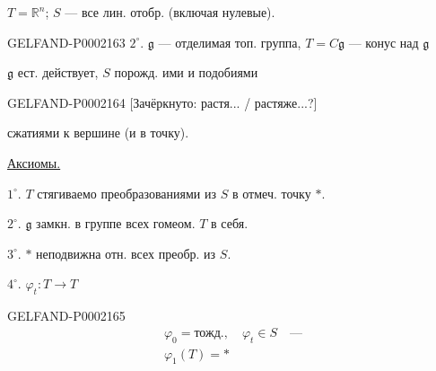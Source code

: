 $T=\mathbb R^n$; $S$ --- все лин. отобр. (включая нулевые).



\begin{GelfandAdjacentEvidence}{GELFAND-P000216}{3}
$2^{\circ}$. $\mathfrak g$ --- отделимая топ. группа, $T=C\mathfrak g$ --- конус над $\mathfrak g$







\end{GelfandAdjacentEvidence}

$\mathfrak g$ ест. действует, $S$ порожд. ими и подобиями



\begin{GelfandAdjacentEvidence}{GELFAND-P000216}{4}
[Зачёркнуто: растя... / растяже...?]
\end{GelfandAdjacentEvidence}

сжатиями к вершине (и в точку).



\underline{Аксиомы.}



$1^{\circ}$. $T$ стягиваемо преобразованиями из $S$ в отмеч. точку $\ast$.



$2^{\circ}$. $\mathfrak g$ замкн. в группе всех гомеом. $T$ в себя.



$3^{\circ}$. $\ast$ неподвижна отн. всех преобр. из $S$.



$4^{\circ}$. $\varphi_t:T\longrightarrow T$



\begin{GelfandAdjacentEvidence}{GELFAND-P000216}{5}
\begin{equation*}\begin{gathered}\varphi_0=\text{тожд.},\quad\varphi_t\in S\quad\text{---}\\\varphi_1(T)=\ast\end{gathered}\end{equation*}
\end{GelfandAdjacentEvidence}

